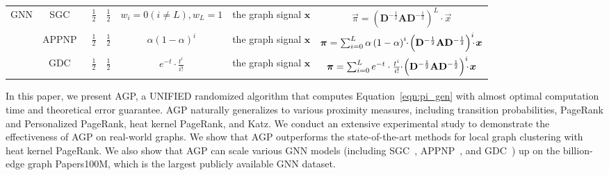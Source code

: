 \begin{table*}[t]
\begin{small}
\begin{tabular}{|c|c|c|c|c|c|c|}
			\multirow{3}{*}{GNN} & SGC~\cite{wu2019SGC} & $\frac{1}{2}$ & $\frac{1}{2}$ & $w_i=0 (i \neq L), w_L=1$ & the graph signal $\bm{x}$ & $\vec{\pi}=\left(\mathbf{D}^{-\frac{1}{2}} \mathbf{A} \mathbf{D}^{-\frac{1}{2}} \right)^L \cdot \vec{x} $\\ \cline{2-7}
			~& APPNP~\cite{Klicpera2018APPNP}  &  $\frac{1}{2}$ & $\frac{1}{2}$ & $\alpha \left( 1-\alpha \right)^i$ & the graph signal $\bm{x}$ & $\vec{\pi}=\sum_{i=0}^L \alpha \left( 1-\alpha \right)^i \hspace{-1mm}\cdot \hspace{-0.5mm} \left(\mathbf{D}^{-\frac{1}{2}}\mathbf{A} \mathbf{D}^{-\frac{1}{2}} \right)^i \hspace{-1.5mm}\cdot \hspace{-0.5mm} \vec{x} $ \\ \cline{2-7}
			~& GDC~\cite{klicpera2019GDC}  &  $\frac{1}{2}$ & $\frac{1}{2}$ & $e^{-t} \cdot \frac{t^i}{i!} $  & the graph signal $\bm{x}$ & $\vec{\pi}=\sum_{i=0}^L e^{-t} \cdot \frac{t^i}{i!}\hspace{-1mm}\cdot \hspace{-0.5mm} \left(\mathbf{D}^{-\frac{1}{2}}\mathbf{A}\mathbf{D}^{-\frac{1}{2}} \right)^i \hspace{-1.5mm}\cdot \hspace{-0.5mm} \vec{x} $ \\ \hline
		\end{tabular}
	\end{small}
	\label{tbl:propagation}
	\vspace{-3mm}
\end{table*}







 




 In this paper, we present AGP, a UNIFIED randomized algorithm that computes Equation~\eqref{eqn:pi_gen} with almost optimal computation time and theoretical error guarantee. AGP naturally generalizes to  various proximity measures, including transition probabilities, PageRank and Personalized PageRank, heat kernel PageRank, and Katz. We conduct an extensive experimental study to demonstrate the effectiveness of AGP on real-world graphs. We show that AGP outperforms the state-of-the-art methods for local graph clustering with heat kernel PageRank.  We  also show that AGP can scale various GNN models (including SGC~\cite{wu2019SGC}, APPNP~\cite{Klicpera2018APPNP}, and GDC~\cite{klicpera2019GDC}) up on the billion-edge graph Papers100M, which is the largest publicly available  GNN dataset.



